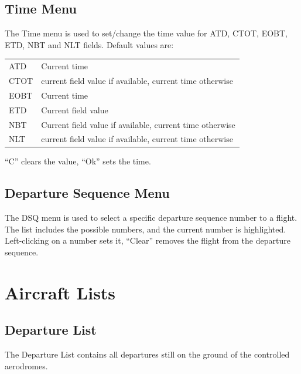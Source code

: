 \documentclass[a4paper,oneside,11pt]{memoir}
\begin{document}
\subsection{Time Menu}
\label{menu:tm}

The Time menu is used to set/change the time value for ATD, CTOT, EOBT, ETD, NBT and NLT fields.
Default values are:

\begin{longtable}{p{5cm} p{7.5cm}}
ATD     & Current time\\
CTOT    & current field value if available, current time otherwise\\
EOBT    & Current time\\
ETD     & Current field value\\
NBT     & Current field value if available, current time otherwise\\
NLT     & current field value if available, current time otherwise\\
\end{longtable}

“C” clears the value, “Ok” sets the time.

\subsection{Departure Sequence Menu}
\label{menu:dqm}

The DSQ menu is used to select a specific departure sequence number to a flight. The list includes the possible numbers, and the current number is highlighted. Left-clicking on a number sets it, “Clear” removes the flight from the departure sequence.


\section{Aircraft Lists}

\subsection{Departure List}\label{list:dep}

The Departure List contains all departures still on the ground of the controlled aerodromes.
\end{document}
